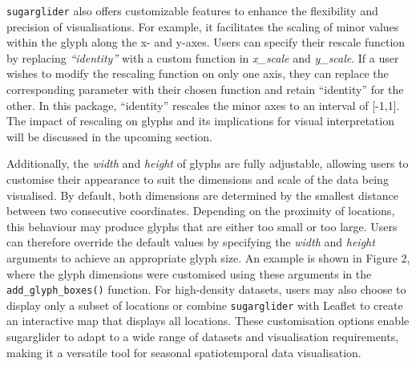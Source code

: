 \texttt{sugarglider} also offers customizable features to enhance the flexibility and precision of visualisations. For example, it facilitates the scaling of minor values within the glyph along the x- and y-axes. Users can specify their rescale function by replacing \emph{``identity''} with a custom function in \emph{x\_scale} and \emph{y\_scale}. If a user wishes to modify the rescaling function on only one axis, they can replace the corresponding parameter with their chosen function and retain ``identity'' for the other. In this package, ``identity'' rescales the minor axes to an interval of {[}-1,1{]}. The impact of rescaling on glyphs and its implications for visual interpretation will be discussed in the upcoming section.

Additionally, the \emph{width} and \emph{height} of glyphs are fully adjustable, allowing users to customise their appearance to suit the dimensions and scale of the data being visualised. By default, both dimensions are determined by the smallest distance between two consecutive coordinates. Depending on the proximity of locations, this behaviour may produce glyphs that are either too small or too large. Users can therefore override the default values by specifying the \emph{width} and \emph{height} arguments to achieve an appropriate glyph size. An example is shown in Figure 2, where the glyph dimensions were customised using these arguments in the \texttt{add\_glyph\_boxes()} function. For high-density datasets, users may also choose to display only a subset of locations or combine \texttt{sugarglider} with Leaflet to create an interactive map that displays all locations. These customisation options enable sugarglider to adapt to a wide range of datasets and visualisation requirements, making it a versatile tool for seasonal spatiotemporal data visualisation.


